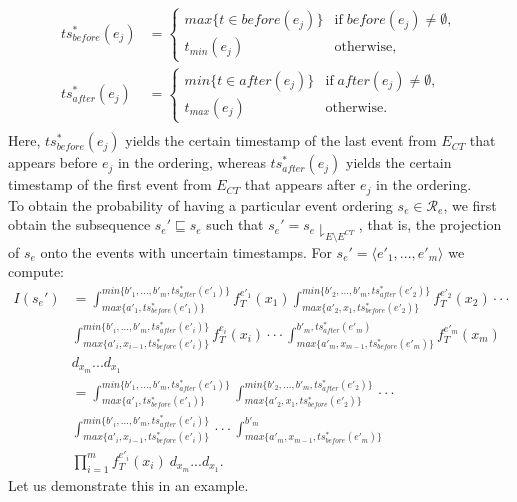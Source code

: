 \begin{itemize}
\begin{align*}
ts^*_{before}(e_j) &= \begin{cases}
	max\{t \in before(e_j)\} & \mbox{if} \; before(e_j) \neq \emptyset,\\
	t_{min}(e_j) & \mbox{otherwise}, \; 
	\end{cases} \\
ts^*_{after}(e_j) &= \begin{cases}
	min\{t \in after(e_j)\} & \mbox{if} \; after(e_j) \neq \emptyset,\\
	t_{max}(e_j) & \mbox{otherwise}. \; 
	\end{cases} \\
\end{align*}
Here, $ts^*_{before}(e_j)$ yields the certain timestamp of the last event from $E_{CT}$ that appears before $e_j$ in the ordering, whereas $ts^*_{after}(e_j)$ yields the certain timestamp of the first event from $E_{CT}$ that appears after $e_j$ in the ordering.\\
To obtain the probability of having a particular event ordering $s_e \in \mathcal{R}_e$, we first obtain the subsequence $s_e'\sqsubseteq s_e$ such that $s_e' = s_e \downharpoonright_{E \setminus E^{CT}}$, that is, the projection of $s_e$ onto the events with uncertain timestamps.
For $s_e'=\langle e'_1,...,e'_m \rangle$ we compute:
\begin{align*}
I(s_e') &= \int_{max\{a'_1,ts^*_{before}(e'_1)\}}^{min\{b'_1,...,b'_m,ts^*_{after}(e'_1)\}} f_T^{e'_1}(x_1)
\int_{max\{a'_2,x_1,ts^*_{before}(e'_2)\}}^{min\{b'_2,...,b'_m,ts^*_{after}(e'_2)\}} f_T^{e'_2}(x_2)
\cdot \cdot \cdot \\
&
\int_{max\{a'_i,x_{i-1},ts^*_{before}(e'_i)\}}^{min\{b'_i,...,b'_m,ts^*_{after}(e'_i)\}} f_T^{e_i}(x_i)
\cdot \cdot \cdot 
\int_{max\{a'_m,x_{m-1},ts^*_{before}(e'_m)\}}^{b'_m,ts^*_{after}(e'_m)} f_T^{e'_m}(x_m) ~\\
&
d_{x_m} ... d_{x_1} \\
&=
\int_{max\{a'_1, ts^*_{before}(e'_1)\}}^{min\{b'_1,...,b'_m,ts^*_{after}(e'_1)\}}
\int_{max\{a'_2,x_1,ts^*_{before}(e'_2)\}}^{min\{b'_2,...,b'_m,ts^*_{after}(e'_2)\}}
\cdot \cdot \cdot \\
&
\int_{max\{a'_i,x_{i-1},ts^*_{before}(e'_i)\}}^{min\{b'_i,...,b'_m,ts^*_{after}(e'_i)\}}
\cdot \cdot \cdot 
\int_{max\{a'_m,x_{m-1},ts^*_{before}(e'_m)\}}^{b'_m} \\
&
\prod_{i=1}^{m} f_T^{e'_i}(x_i) ~
d_{x_m} ... d_{x_1}.
\end{align*}
Let us demonstrate this in an example.

\end{itemize}
